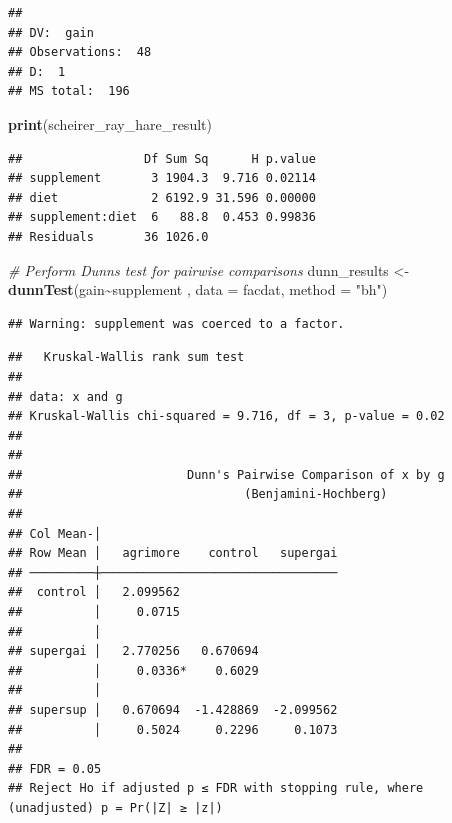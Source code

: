 \documentclass[
]{article}
\newenvironment{Shaded}{\begin{snugshade}}{\end{snugshade}}
\newcommand{\AttributeTok}[1]{\textcolor[rgb]{0.13,0.29,0.53}{#1}}
\newcommand{\CommentTok}[1]{\textcolor[rgb]{0.56,0.35,0.01}{\textit{#1}}}
\newcommand{\FunctionTok}[1]{\textcolor[rgb]{0.13,0.29,0.53}{\textbf{#1}}}
\newcommand{\NormalTok}[1]{#1}
\newcommand{\OtherTok}[1]{\textcolor[rgb]{0.56,0.35,0.01}{#1}}
\newcommand{\SpecialCharTok}[1]{\textcolor[rgb]{0.81,0.36,0.00}{\textbf{#1}}}
\newcommand{\StringTok}[1]{\textcolor[rgb]{0.31,0.60,0.02}{#1}}
\begin{document}
\begin{verbatim}
## 
## DV:  gain 
## Observations:  48 
## D:  1 
## MS total:  196
\end{verbatim}

\begin{Shaded}
\begin{Highlighting}[]
\FunctionTok{print}\NormalTok{(scheirer\_ray\_hare\_result)}
\end{Highlighting}
\end{Shaded}

\begin{verbatim}
##                 Df Sum Sq      H p.value
## supplement       3 1904.3  9.716 0.02114
## diet             2 6192.9 31.596 0.00000
## supplement:diet  6   88.8  0.453 0.99836
## Residuals       36 1026.0
\end{verbatim}

\begin{Shaded}
\begin{Highlighting}[]
\CommentTok{\# Perform Dunn\textquotesingle{}s test for pairwise comparisons}
\NormalTok{dunn\_results }\OtherTok{\textless{}{-}} \FunctionTok{dunnTest}\NormalTok{(gain}\SpecialCharTok{\textasciitilde{}}\NormalTok{supplement , }\AttributeTok{data =}\NormalTok{ facdat, }\AttributeTok{method =} \StringTok{"bh"}\NormalTok{)}
\end{Highlighting}
\end{Shaded}

\begin{verbatim}
## Warning: supplement was coerced to a factor.
\end{verbatim}

\begin{verbatim}
##   Kruskal-Wallis rank sum test
## 
## data: x and g
## Kruskal-Wallis chi-squared = 9.716, df = 3, p-value = 0.02
## 
## 
##                       Dunn's Pairwise Comparison of x by g                      
##                               (Benjamini-Hochberg)                              
## 
## Col Mean-│
## Row Mean │   agrimore    control   supergai
## ─────────┼─────────────────────────────────
##  control │   2.099562
##          │     0.0715 
##          │
## supergai │   2.770256   0.670694
##          │     0.0336*    0.6029 
##          │
## supersup │   0.670694  -1.428869  -2.099562
##          │     0.5024     0.2296     0.1073 
## 
## FDR = 0.05
## Reject Ho if adjusted p ≤ FDR with stopping rule, where (unadjusted) p = Pr(|Z| ≥ |z|)
\end{verbatim}
\end{document}
